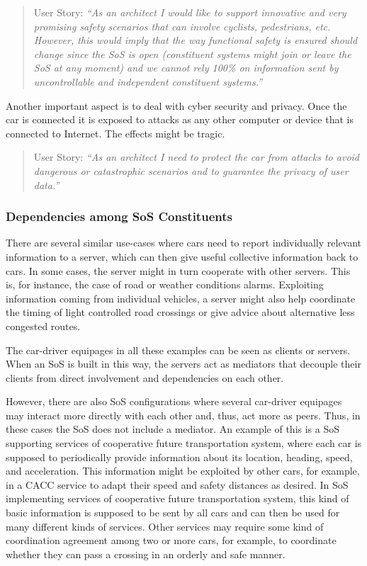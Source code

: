 \begin{quote}
{User Story:} 
\emph{``As an architect I would like to support innovative and very promising safety scenarios %
that can involve cyclists, pedestrians, etc. However, this would imply that the way functional safety is ensured should change since the SoS is open (constituent systems might join or leave the SoS at any moment) and we cannot rely 100\% on information sent by uncontrollable and independent constituent systems.''}
\end{quote}


Another important aspect is to deal with cyber security and privacy. Once the car is connected it is exposed to attacks as any other computer or device that is connected to Internet. The effects might be tragic.

\begin{quote}
{User Story:} 
\emph{``As an architect I need to protect the car from attacks to avoid dangerous or catastrophic scenarios and to guarantee the privacy of user data.''} %
\end{quote}


\subsubsection{Dependencies among SoS Constituents}
There are several similar use-cases where cars need to report individually relevant information to a server, which can then give useful collective information back to cars. In some cases, the server might in turn cooperate with other servers. This is, for instance, the case of road or weather conditions alarms. Exploiting information coming from individual vehicles, a server might also help coordinate the timing of light controlled road crossings or give advice about alternative less congested routes.

The car-driver equipages in all these examples can be seen as clients or servers. When an SoS is built in this way, the servers act as mediators that decouple their clients from direct involvement and dependencies on each other.

However, there are also SoS configurations where several car-driver equipages may interact more directly with each other and, thus, act more as peers. Thus, in these cases the SoS does not include a mediator. An example of this is a SoS supporting services of cooperative future transportation system, where each car is supposed to periodically provide information about its location, heading, speed, and acceleration. This information might be exploited by other cars, for example, in a CACC service to adapt their speed and safety distances as desired. In SoS implementing services of cooperative future transportation system, this kind of basic information is supposed to be sent by all cars and can then be used for many different kinds of services. Other services may require some kind of coordination agreement among two or more cars, for example, to coordinate whether they can pass a crossing in an orderly and safe manner.

